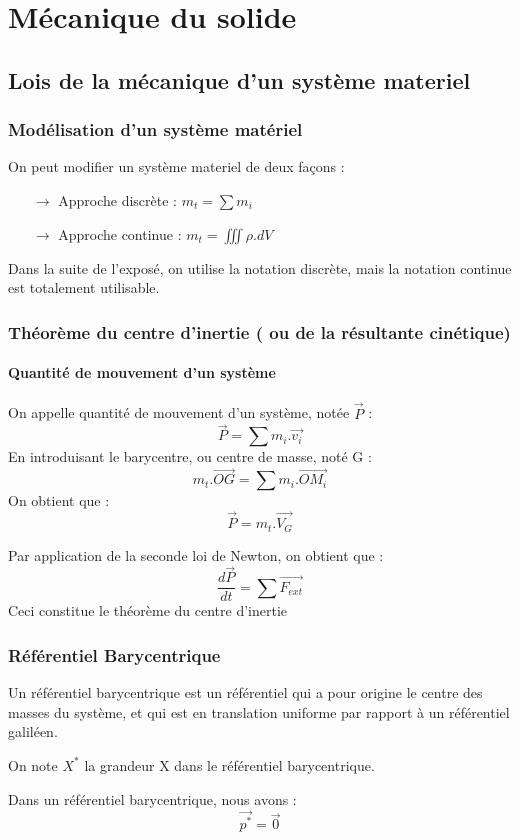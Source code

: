 
\chapter{Mécanique du solide}
\section{Lois de la mécanique d'un système materiel}
\subsection{Modélisation d'un système matériel}
On peut modifier un système materiel de deux façons : 
\begin{itemize}
 \item[$\rightarrow$] Approche discrète : $m_t = \sum m_i$
 \item[$\rightarrow$] Approche continue : $m_t = \iiint \rho.dV$
\end{itemize}
Dans la suite de l'exposé, on utilise la notation discrète, mais la notation continue est totalement utilisable.
\subsection{Théorème du centre d'inertie ( ou de la résultante cinétique) }
\subsubsection{Quantité de mouvement d'un système}
\begin{de}
On appelle quantité de mouvement d'un système, notée $\overrightarrow{P}$ : 
$$\overrightarrow{P} = \sum m_i.\overrightarrow{v_i}$$
En introduisant le barycentre, ou centre de masse, noté G : 
$$m_t.\overrightarrow{OG} = \sum m_i.\overrightarrow{OM_i}$$
On obtient que : 
$$\overrightarrow{P} = m_t.\overrightarrow{V_G}$$
\end{de}
\begin{theo}
Par application de la seconde loi de Newton, on obtient que : 
$$\dfrac{d\overrightarrow{P}}{dt} = \sum\overrightarrow{F_{ext}}$$
Ceci constitue le théorème du centre d'inertie
\end{theo}
\subsection{Référentiel Barycentrique}
\begin{de}
Un référentiel barycentrique est un référentiel qui a pour origine le centre des masses du système, et qui est en translation uniforme par rapport à un référentiel galiléen.
\end{de}
\begin{de}
On note $X^*$ la grandeur X dans le référentiel barycentrique.
\end{de}
\begin{prop}
Dans un référentiel barycentrique, nous avons : 
$$\overrightarrow{p^*} = \overrightarrow{0}$$
\end{prop}
